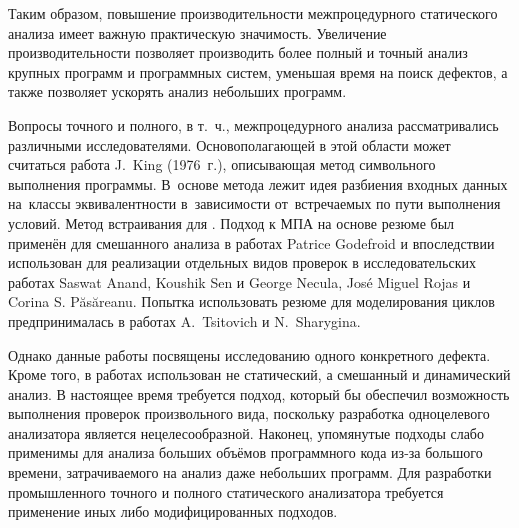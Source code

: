 
Таким образом, повышение производительности межпроцедурного статического анализа имеет важную практическую значимость. Увеличение производительности позволяет производить более полный и точный анализ крупных программ и программных систем, уменьшая время на поиск дефектов, а также позволяет ускорять анализ небольших программ.

Вопросы точного и полного, в т.~ч., межпроцедурного анализа рассматривались различными исследователями. Основополагающей в этой области может считаться работа J.~King (1976~г.), описывающая метод символьного выполнения программы. В~основе метода лежит идея разбиения входных данных на~классы эквивалентности в~зависимости от~встречаемых по пути выполнения условий. Метод встраивания для  . Подход к МПА на основе резюме был применён для смешанного анализа в работах Patrice Godefroid и впоследствии использован для реализации отдельных видов проверок в исследовательских работах Saswat Anand, Koushik Sen и George Necula, Jos\'{e} Miguel Rojas и Corina S. P\u{a}s\u{a}reanu. Попытка использовать резюме для моделирования циклов предпринималась в работах A.~Tsitovich и N.~Sharygina.

Однако данные работы посвящены исследованию одного конкретного дефекта. Кроме того, в работах использован не статический, а смешанный и динамический анализ. В настоящее время требуется подход, который бы обеспечил возможность выполнения проверок произвольного вида, поскольку разработка одноцелевого анализатора является нецелесообразной. Наконец, упомянутые подходы слабо применимы для анализа больших объёмов программного кода из-за большого времени, затрачиваемого на анализ даже небольших программ. Для разработки промышленного точного и полного статического анализатора требуется применение иных либо модифицированных подходов.

